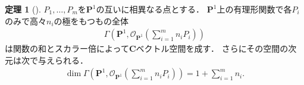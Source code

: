 \documentclass[11pt, a4paper, dvipdfmx, draft]{jsarticle}
\theoremstyle{definition}
\newtheorem{Theorem}[Axiom]{定理}
\newcommand{\cc}{\mathbf{C}}
\newcommand{\pp}{\mathbf{P}}
\newcommand{\mcal}{\mathcal}
\newcommand{\OO}{\mcal{O}}
\theoremstyle{mystyle}
\numberwithin{equation}{section} %
\begin{document}
\begin{Theorem}[{\cite[命題1.14]{ogs}}]
    $P_{1},\dots,P_{m}$を$\pp^{1}$の互いに相異なる点とする．
    $\pp^{1}$上の有理形関数で各$P_i$のみで高々$n_i$の極をもつもの全体
    \begin{align*}
        \Gamma\left(\pp^{1}, \OO_{\pp^{1}}\left(\sum_{i=1}^{m}n_{i}P_{i}\right)\right)
    \end{align*}
    は関数の和とスカラー倍によって$\cc$ベクトル空間を成す．
    さらにその空間の次元は次で与えられる．
    \begin{align*}
        \dim\Gamma\left(
            \pp^{1}, \OO_{\pp^{1}}\left(
                \sum_{i=1}^{m}n_{i}P_{i}
                \right)
            \right)
        = 1+\sum_{i=1}^{m}n_{i}.
    \end{align*}
\end{Theorem}

\newcommand{\rrsp}{\Gamma\left(\pp^{1}, \OO_{\pp^{1}}\left(\sum_{i=1}^{m}n_{i}P_{i}\right)\right)}
\end{document}
